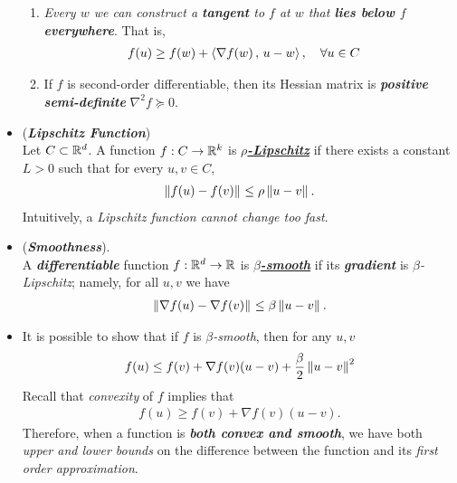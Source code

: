 \documentclass[11pt]{article}
\begin{document}
\begin{itemize}
\begin{remark}
\begin{enumerate}
\item \emph{Every $w$ we can construct a \textbf{tangent} to $f$ at $w$ that \textbf{lies below $f$ everywhere}}. That is,
\begin{align*}
f(u) &\ge f(w) +\left\langle \nabla f(w)\,,\, u - w \right\rangle, \quad \forall u \in C
\end{align*}

\item If $f$ is second-order differentiable, then its Hessian matrix is \emph{\textbf{positive semi-definite}} $\nabla^2 f \succeq 0$.
\end{enumerate}
\end{remark}

\item \begin{definition}(\textbf{\emph{Lipschitz Function}})\\
Let $C \subset {\mathbb R}^d$. A function $f : C \to {\mathbb R}^k$ is \underline{\emph{\textbf{$\rho$-Lipschitz}}} if there exists a constant $L > 0$ such that  for every $u,v \in C$,
\begin{align*}
\left\|f(u) - f(v)\right\|_{} \le \rho \left\|u - v\right\|_{}.
\end{align*}  Intuitively, a \emph{Lipschitz function cannot change too fast}.
\end{definition}

\item \begin{definition} (\emph{\textbf{Smoothness}}). \\
A \emph{\textbf{differentiable}} function $f : {\mathbb R}^d \to {\mathbb R}$ is \underline{\emph{\textbf{$\beta$-smooth}}} if its \emph{\textbf{gradient}} is \emph{$\beta$-Lipschitz}; namely, for all $u,v$ we have 
\begin{align*}
\left\|\nabla f(u) - \nabla f(v)\right\|_{} \le \beta \left\|u - v\right\|_{}.
\end{align*} 
\end{definition}

\item \begin{remark}
It is possible to show that if $f$ is \emph{$\beta$-smooth}, then for any $u, v$
\begin{align*}
f(u) \le f(v) + \nabla f(v) (u - v)  + \frac{\beta}{2}\left\|u -v\right\|_{}^2
\end{align*} Recall that \emph{convexity} of $f$ implies that 
\begin{align*}
f(u) \ge f(v) + \nabla f(v) (u - v).
\end{align*}
Therefore, when a function is \emph{\textbf{both convex and smooth}}, we have both \emph{upper and lower bounds} on the difference between the function and its \emph{first order approximation}.
\end{remark}


\end{itemize}
\end{document}

